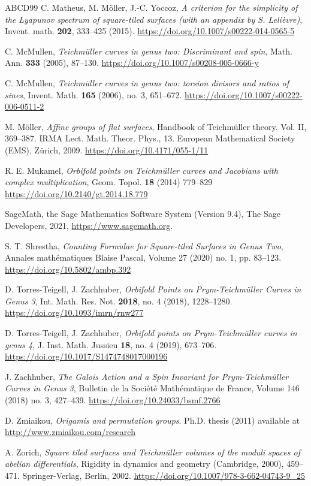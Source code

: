 \documentclass[a4paper,11pt]{amsart}
\numberwithin{equation}{section}
\numberwithin{figure}{section}
\numberwithin{table}{section}
\newcommand{\teichmuller}{Teichm{\"u}ller }
\begin{document}
\begin{thebibliography}{ABCD99}
 C. Matheus, M. M\"oller, J.-C. Yoccoz, {\em A criterion for the simplicity of the Lyapunov spectrum of square-tiled surfaces (with an appendix by S. Leli\`evre)}, Invent. math. \textbf{202}, 333–425 (2015). \url{https://doi.org/10.1007/s00222-014-0565-5}

 C. McMullen, {\em \teichmuller curves in genus two: Discriminant and spin}, Math. Ann. \textbf{333} (2005), 87--130. \url{https://doi.org/10.1007/s00208-005-0666-y}

 C. McMullen, {\em \teichmuller curves in genus two: torsion divisors and ratios of sines}, Invent. Math. \textbf{165} (2006), no. 3, 651--672. \url{https://doi.org/10.1007/s00222-006-0511-2}

 M. M\"oller, {\em Affine groups of flat surfaces}, Handbook of Teichm\"uller theory. Vol. II, 369–387. IRMA Lect. Math. Theor. Phys., 13. European Mathematical Society (EMS), Z\"urich, 2009. \url{https://doi.org/10.4171/055-1/11}

  R. E. Mukamel, {\em Orbifold points on \teichmuller curves and Jacobians with complex multiplication}, Geom. Topol. \textbf{18} (2014) 779--829 \url{https://doi.org/10.2140/gt.2014.18.779}

 SageMath, the Sage Mathematics Software System (Version 9.4), The Sage Developers, 2021, \url{https://www.sagemath.org}.

 S. T. Shrestha, {\em Counting Formulae for Square-tiled Surfaces in Genus Two}, Annales mathématiques Blaise Pascal, Volume 27 (2020) no. 1, pp. 83--123. \url{https://doi.org/10.5802/ambp.392}

 D. Torres-Teigell, J. Zachhuber, {\em Orbifold Points on Prym-\teichmuller Curves in Genus 3}, Int. Math. Res. Not. \textbf{2018}, no. 4 (2018), 1228--1280. \url{https://doi.org/10.1093/imrn/rnw277}

 D. Torres-Teigell, J. Zachhuber, {\em Orbifold points on Prym-\teichmuller curves in genus 4}, J. Inst. Math. Jussieu \textbf{18}, no. 4 (2019), 673--706. \url{https://doi.org/10.1017/S1474748017000196}

 J. Zachhuber, {\em The Galois Action and a Spin Invariant for Prym-Teichmüller Curves in Genus 3}, Bulletin de la Société Mathématique de France, Volume 146 (2018) no. 3, 427--439. \url{https://doi.org/10.24033/bsmf.2766}

 D. Zmiaikou, {\em Origamis and permutation groups}. Ph.D. thesis (2011) available at \url{http://www.zmiaikou.com/research}

 A. Zorich, {\em Square tiled surfaces and Teichm\"uller volumes of the moduli spaces of abelian differentials}, Rigidity in dynamics and geometry (Cambridge, 2000), 459--471. Springer-Verlag, Berlin, 2002. \url{https://doi.org/10.1007/978-3-662-04743-9_25}

\end{thebibliography}
\end{document}
